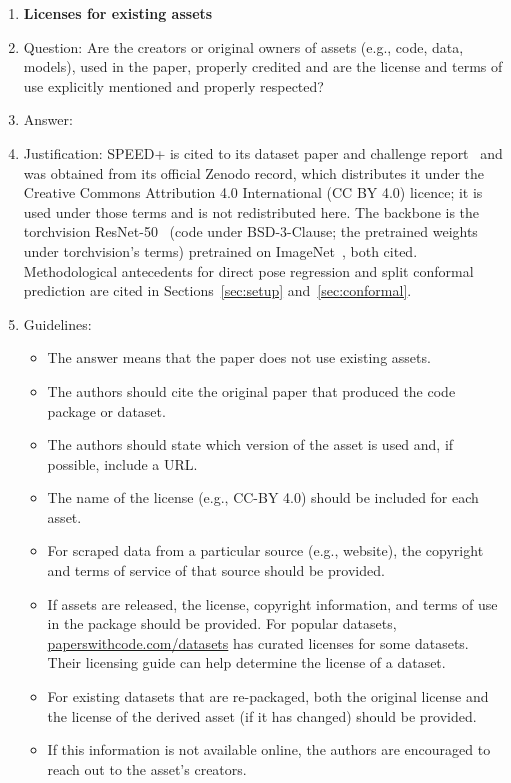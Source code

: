 \begin{enumerate}
\item {\bf Licenses for existing assets}
    \item[] Question: Are the creators or original owners of assets (e.g., code, data, models), used in the paper, properly credited and are the license and terms of use explicitly mentioned and properly respected?
    \item[] Answer: \answerYes{}
    \item[] Justification: SPEED+ is cited to its dataset paper and challenge
    report~\citep{park2022speedplus,kisantal2020speed} and was obtained from its official
    Zenodo record, which distributes it under the Creative Commons Attribution 4.0
    International (CC BY 4.0) licence; it is used under those terms and is not
    redistributed here. The backbone is the torchvision ResNet-50~\citep{he2016resnet}
    (code under BSD-3-Clause; the pretrained weights under torchvision's terms)
    pretrained on ImageNet~\citep{deng2009imagenet}, both
    cited. Methodological antecedents for direct pose regression and split conformal
    prediction are cited in Sections~\ref{sec:setup} and~\ref{sec:conformal}.
    \item[] Guidelines:
    \begin{itemize}
        \item The answer \answerNA{} means that the paper does not use existing assets.
        \item The authors should cite the original paper that produced the code package or dataset.
        \item The authors should state which version of the asset is used and, if possible, include a URL.
        \item The name of the license (e.g., CC-BY 4.0) should be included for each asset.
        \item For scraped data from a particular source (e.g., website), the copyright and terms of service of that source should be provided.
        \item If assets are released, the license, copyright information, and terms of use in the package should be provided. For popular datasets, \url{paperswithcode.com/datasets} has curated licenses for some datasets. Their licensing guide can help determine the license of a dataset.
        \item For existing datasets that are re-packaged, both the original license and the license of the derived asset (if it has changed) should be provided.
        \item If this information is not available online, the authors are encouraged to reach out to the asset's creators.
    \end{itemize}


\end{enumerate}

